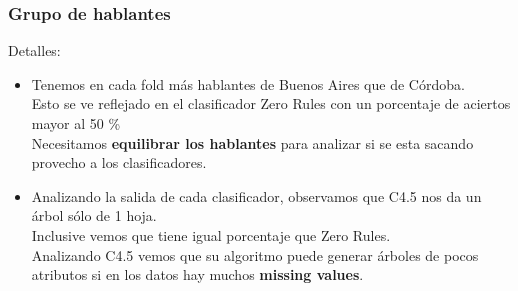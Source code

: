 \documentclass[mathserif]{beamer}%
\begin{document}
\begin{frame}
	\frametitle{Grupo de hablantes}
	
	Detalles:
	\begin{itemize}
		\item Tenemos en cada fold más hablantes de Buenos Aires que de Córdoba. \\
		Esto se ve reflejado en el clasificador Zero Rules con un porcentaje de aciertos mayor al 50 \% \\
		Necesitamos \textbf{equilibrar los hablantes} para analizar si se esta sacando provecho a los clasificadores.

		\pause

		\item Analizando la salida de cada clasificador, observamos que C4.5 nos da un árbol sólo de 1 hoja. \\
		Inclusive vemos que tiene igual porcentaje que Zero Rules. \\
		Analizando C4.5 vemos que su algoritmo puede generar árboles de pocos atributos si en los datos hay muchos \textbf{missing values}.
	\end{itemize}
\end{frame}
\end{document}
